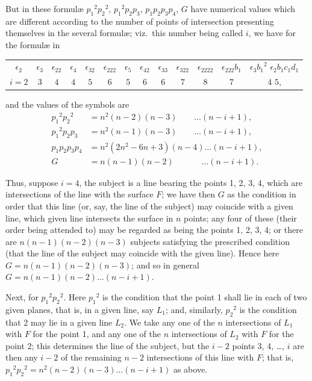\documentclass[11pt,a4paper,english]{article}
\theoremstyle{plain}
\begin{document}
But in these formul\ae{} ${p_1}^2{p_2}^2$, ${p_1}^2p_2p_3$, $p_1p_2p_3p_4$, $G$ have numerical values which are different according to the number of points of intersection presenting themselves in the several formul\ae{}; viz.\ this number being called $i$, we have for the formul\ae{} in
\begin{center}
\begin{tabular}{c c c c c c c c c c c c c}
$\epsilon_2$ & $\epsilon_3$ & $\epsilon_{22}$ & $\epsilon_4$ & $\epsilon_{32}$ & $\epsilon_{222}$ & $\epsilon_5$ & $\epsilon_{42}$ & $\epsilon_{33}$ & $\epsilon_{322}$ & $\epsilon_{2222}$ & $\epsilon_{222}b_1$ & $\epsilon_3{b_1}^2$ \quad $\epsilon_2b_1c_1d_1$ \\
$i = 2$ & $3$ & $4$ & $4$ & $5$ & $6$ & $5$ & $6$ & $6$ & $7$ & $8$ & $7$ & $4$ \qquad $5$,
\end{tabular}
\end{center}
and the values of the symbols are
\begin{align*}
{p_1}^2{p_2}^2 &= n^2(n-2)(n-3) \quad\quad \ldots (n-i+1), \\
{p_1}^2p_2p_3 &= n^2(n-1)(n-3) \quad\quad \ldots (n-i+1), \\
p_1p_2p_3p_4 &= n^2(2n^2 - 6n + 3)(n-4) \ldots (n-i+1), \\
G &= n(n-1)(n-2) \quad\quad\quad\; \ldots (n-i+1).
\end{align*}

Thus, suppose $i = 4$, the subject is a line bearing the points 1, 2, 3, 4, which are intersections of the line with the surface $F$; we have then $G$ as the condition in order that this line (or, say, the line of the subject) may coincide with a given line, which given line intersects the surface in $n$ points; any four of these (their order being attended to) may be regarded as being the points 1, 2, 3, 4; or there are $n(n-1)(n-2)(n-3)$ subjects satisfying the prescribed condition (that the line of the subject may coincide with the given line). Hence here $G = n(n-1)(n-2)(n-3)$; and so in general $G = n(n-1)(n-2)\ldots(n-i+1)$.

Next, for ${p_1}^2{p_2}^2$. Here ${p_1}^2$ is the condition that the point 1 shall lie in each of two given planes, that is, in a given line, say $L_1$; and, similarly, ${p_2}^2$ is the condition that 2 may lie in a given line $L_2$. We take any one of the $n$ intersections of $L_1$ with $F$ for the point 1, and any one of the $n$ intersections of $L_2$ with $F$ for the point 2; this determines the line of the subject, but the $i-2$ points 3, 4, \ldots, $i$ are then any $i-2$ of the remaining $n-2$ intersections of this line with $F$; that is, ${p_1}^2{p_2}^2 = n^2(n-2)(n-3)\ldots(n-i+1)$ as above.
\end{document}
